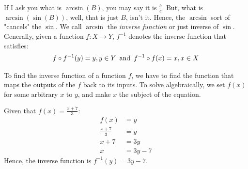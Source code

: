 If I ask you what is \(\arcsin(B)\), you may say it is \(\frac{b}{c}\). But, what is \(\arcsin(\sin(B))\), well, that is just \(B\), isn't it. Hence, the \(\arcsin\) sort of "cancels" the \(\sin\). We call \(\arcsin\) the \textit{inverse function} or just inverse of \(\sin\).  Generally, given a function \(f: X \to Y\), \(f^{-1}\) denotes the inverse function that satisfies:
\begin{equation}
  f \circ f^{-1}(y) = y, y \in Y \text{\, and \,} f^{-1} \circ f(x) = x, x \in X
\end{equation}

To find the inverse function of a function \(f\), we have to find the function that maps the outputs of the \(f\) back to its inputs. To solve algebraically, we set \(f(x)\) for some arbitrary \(x\) to \(y\), and make \(x\) the subject of the equation.
\begin{example}
  Given that \(f(x)=\frac{x+7}{3}\):
  \begin{align*}
    f(x)&=y \\
    \frac{x+7}{3}&=y \\
    x+7&=3y \\
    x&=3y-7
  \end{align*}
  Hence, the inverse function is \(f^{-1}(y)=3y-7\).
\end{example}

